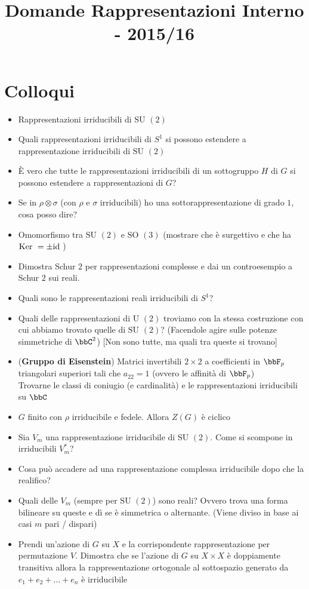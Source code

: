 \documentclass[a4paper,NoNotes,GeneralMath]{stdmdoc}
\newcommand{\SU}{\text{SU }}
\newcommand{\SO}{\text{SO }}
\newcommand{\U}{\text{U }}
\begin{document}
	\title{Domande Rappresentazioni Interno - 2015/16}

	\section*{Colloqui}
	\begin{itemize}
		\item Rappresentazioni irriducibili di $\SU(2)$
		\item Quali rappresentazioni irriducibili di $S^1$ si possono estendere a rappresentazione irriducibili di $\SU(2)$
		\item È vero che tutte le rappresentazioni irriducibili di un sottogruppo $H$ di $G$ si possono estendere a rappresentazioni di $G$?
		\item Se in $\rho \otimes \sigma$ (con $\rho$ e $\sigma$ irriducibili) ho una sottorappresentazione di grado $1$, cosa posso dire?
		\item Omomorfismo tra $\SU(2)$ e $\SO(3)$ (mostrare che è surgettivo e che ha $\mbox{Ker } = \pm \mbox{id}$ )
		\item Dimostra Schur $2$ per rappresentazioni complesse e dai un controesempio a Schur $2$ sui reali.
		\item Quali sono le rappresentazioni reali irriducibili di $S^1$?
		\item Quali delle rappresentazioni di $\U(2)$ troviamo con la stessa costruzione con cui abbiamo trovato quelle di $\SU(2)$? (Facendole agire sulle potenze simmetriche di $\bbC^2$) [Non sono tutte, ma quali tra queste si trovano]
		\item ({\bf Gruppo di Eisenstein}) Matrici invertibili $2\times 2$ a coefficienti in $\bbF_p$ triangolari superiori tali che $a_{22} = 1$ (ovvero le affinità di $\bbF_p$) \\
			Trovarne le classi di coniugio (e cardinalità) e le rappresentazioni irriducibili su $\bbC$
		\item $G$ finito con $\rho$ irriducibile e fedele. Allora $Z(G)$ è ciclico
		\item Sia $V_m$ una rappresentazione irriducibile di $\SU(2)$. Come si scompone in irriducibili $V_m^*$?
		\item Cosa può accadere ad una rappresentazione complessa irriducibile dopo che la realifico?
		\item Quali delle $V_m$ (sempre per $\SU(2)$) sono reali? Ovvero trova una forma bilineare su queste e dì se è simmetrica o alternante. (Viene diviso in base ai casi $m$ pari / dispari)
		\item Prendi un'azione di $G$ su $X$ e la corrispondente rappresentazione per permutazione $V$. Dimostra che se l'azione di $G$ su $X\times X$ è doppiamente transitiva allora la rappresentazione ortogonale al sottospazio generato da ${e_1 + e_2 + \ldots + e_n}$ è irriducibile

\end{itemize}
\end{document}
